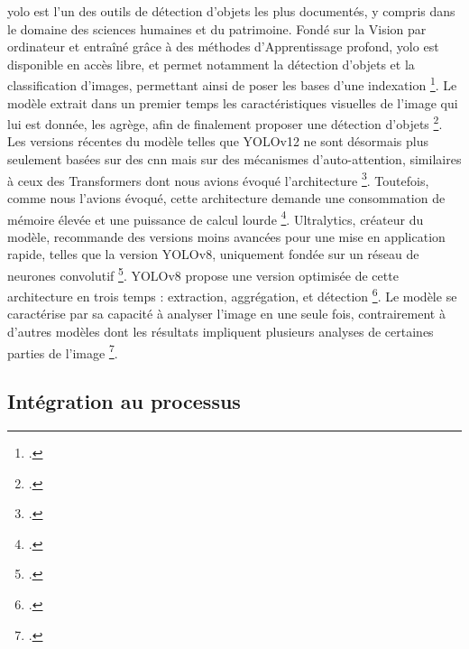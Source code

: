 \gls{yolo} est l’un des outils de détection d’objets les plus documentés, y compris dans le domaine des sciences humaines et du patrimoine. Fondé sur la \gls{Vision par ordinateur} et entraîné grâce à des méthodes d'\gls{Apprentissage profond}, \gls{yolo} est disponible en accès libre, et permet notamment la détection d'objets et la classification d'images, permettant ainsi de poser les bases d’une indexation \footcite{jocher2022}. Le modèle extrait dans un premier temps les caractéristiques visuelles de l'image qui lui est donnée, les agrège, afin de finalement proposer une détection d'objets \footcite{norindr2023}. Les versions récentes du modèle telles que YOLOv12 ne sont désormais plus seulement basées sur des \gls{cnn} mais sur des mécanismes d'auto-attention, similaires à ceux des \gls{Transformers} dont nous avions évoqué l'architecture \footcite{2025b}. Toutefois, comme nous l'avions évoqué, cette architecture demande une consommation de mémoire élevée et une puissance de calcul lourde \footcite{2025b}. Ultralytics, créateur du modèle, recommande des versions moins avancées pour une mise en application rapide, telles que la version YOLOv8, uniquement fondée sur un réseau de neurones convolutif \footcite{2023c}. YOLOv8 propose une version optimisée de cette architecture en trois temps : extraction, aggrégation, et détection \footcite{yaseen2024}. Le modèle se caractérise par sa capacité à analyser l'image en une seule fois, contrairement à d'autres modèles dont les résultats impliquent plusieurs analyses de certaines parties de l'image \footcite{redmon2016}.  

\subsection{Intégration au processus}

